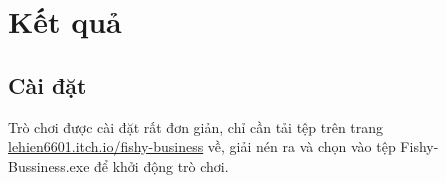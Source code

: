 \section{Kết quả}

\subsection{Cài đặt}
Trò chơi được cài đặt rất đơn giản, chỉ cần tải tệp trên trang \href{https://lehien6601.itch.io/fishy-business}{lehien6601.itch.io/fishy-business} về, giải nén ra và chọn vào tệp Fishy-Bussiness.exe để khởi động trò chơi.


%

